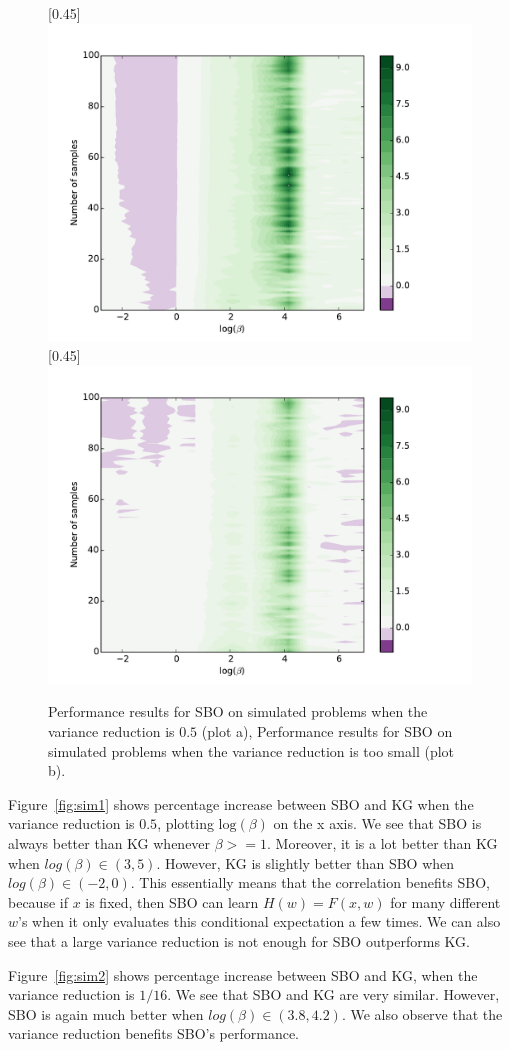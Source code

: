\documentclass{article}
\newcommand{\w}{w}
\begin{document}
\begin{figure}[!htb]
    \centering
{}[0.45\linewidth]{
    \includegraphics[width=0.45\linewidth]{contourPlotbetahN1A2ver2.pdf}}
    \quad
    [0.45\linewidth]{
      \includegraphics[width=0.45\linewidth]{contourPlotbetahN8A2ver2.pdf}}
\caption{Performance results for SBO on simulated problems when the variance reduction is $0.5$  (plot a), Performance results for SBO on simulated problems when the variance reduction is too small  (plot b).
    \label{fig:simulated}}
\end{figure}

Figure~\ref{fig:sim1} shows percentage increase between SBO and KG when the variance reduction is $0.5$, plotting $\mbox{log}(\beta)$ on the x axis. We see that SBO is always better than KG whenever $\beta >= 1$. Moreover, it is a lot better than KG when $log(\beta)\in(3,5)$. However, KG is slightly better than SBO when $log(\beta)\in(-2,0)$. This essentially means that the correlation benefits SBO, because if $x$ is fixed, then SBO can learn $H(\w)=F\left(x,\w\right)$ for many different $\w$'s when it only evaluates this conditional expectation a few times. We can also see that a large variance reduction is not enough for SBO outperforms KG. 

Figure~\ref{fig:sim2} shows percentage increase between SBO and KG, when the variance reduction is $1/16$. We see that SBO and KG are very similar. However, SBO is again much better when $log(\beta)\in(3.8,4.2)$. We also observe that the variance reduction benefits SBO's performance.
\end{document}
